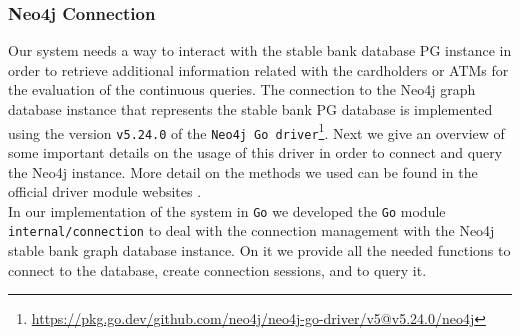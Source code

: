 \subsubsection*{Neo4j Connection}\label{Neo4j-connection}
Our \DPATM system needs a way to interact with the stable bank database PG instance in order to retrieve additional information related with the cardholders or ATMs for the evaluation of the continuous queries. The connection to the Neo4j graph database instance that represents the stable bank PG database is implemented using the version \texttt{v5.24.0} of the \texttt{Neo4j Go driver}\footnote{\url{https://pkg.go.dev/github.com/neo4j/neo4j-go-driver/v5@v5.24.0/neo4j}}. Next we give an overview of some important details on the usage of this driver in order to connect and query the Neo4j instance. More detail on the methods we used can be found in the official driver module websites \cite{neo4j-go-neo4j_go_driver, neo4j-go-neo4j_go_manual}.\\


In our implementation of the \DPATM system in \texttt{Go} we developed the \texttt{Go} module \texttt{internal/connection} to deal with the connection management with the Neo4j stable bank graph database instance.
On it we provide all the needed functions to connect to the database, create connection sessions, and to query it. 


